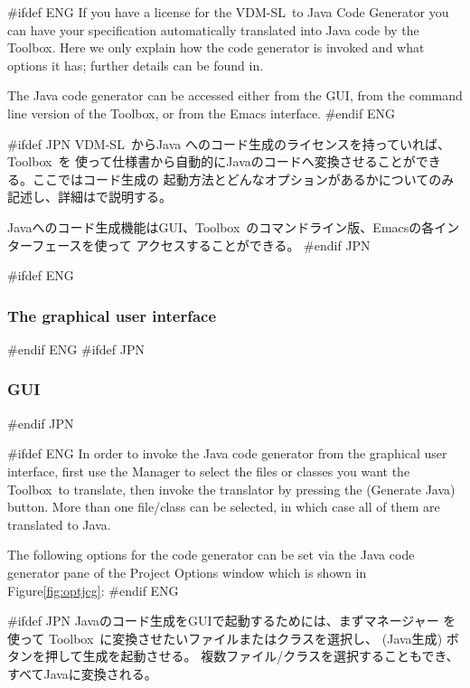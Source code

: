 \documentclass[\pformat,12pt]{article}
\newcommand{\vdmslpp}{VDM-SL}
\newcommand{\Toolbox}{Toolbox}
\newcommand{\vdmslpp}{VDM++}
\newcommand{\Toolbox}{Toolbox}
\newcommand{\guicmd}[1]{{\sf #1}}
\newcommand{\guicmd}[1]{{\gt #1}}
\begin{document}
#ifdef ENG
If you have a license  for the \vdmslpp\ to Java
Code Generator you can have your specification automatically 
translated into Java code by the \Toolbox. Here we only explain how the
code generator is invoked and what options it has; further details can
be found in\cite{CGJavaManPP-CSK}.

The Java code generator can be accessed either from the GUI, from the
command line version of the \Toolbox, or from the Emacs interface.
#endif ENG

#ifdef JPN
\vdmslpp\ からJava へのコード生成のライセンスを持っていれば、\Toolbox\ を
使って仕様書から自動的にJavaのコードへ変換させることができる。ここではコード生成の
起動方法とどんなオプションがあるかについてのみ記述し、詳細は\cite{CGJavaManPP-CSK}で説明する。

Javaへのコード生成機能はGUI、\Toolbox\ のコマンドライン版、Emacsの各インターフェースを使って
アクセスすることができる。
#endif JPN

#ifdef ENG
\subsubsection{The graphical user interface}
#endif ENG
#ifdef JPN
\subsubsection{GUI}
#endif JPN

#ifdef ENG
In order to invoke the Java code generator from the graphical user
interface, first use the \guicmd{Manager} to select the files or
classes you want
the \Toolbox\ to translate, then invoke the translator by pressing the 
(\guicmd{Generate Java}) button. More than one file/class can be
selected, in which case all of them are translated to Java.

The following options for the code generator can be set via the
\guicmd{Java code generator} pane of the \guicmd{Project Options} window
which is shown in Figure\ref{fig:optjcg}:
#endif ENG

#ifdef JPN
Javaのコード生成をGUIで起動するためには、まず\guicmd{マネージャー} を使って
\Toolbox\ に変換させたいファイルまたはクラスを選択し、
(\guicmd{Java生成}) ボタンを押して生成を起動させる。
複数ファイル/クラスを選択することもでき、すべてJavaに変換される。
\end{document}
